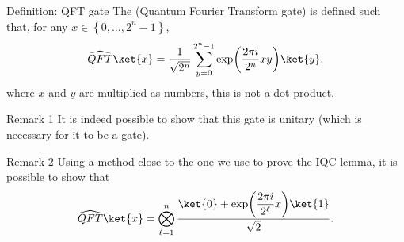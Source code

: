 \documentclass[a4paper]{article}
\begin{document}
\begin{parag}{Definition: QFT gate}
    The  (Quantum Fourier Transform gate) is defined such that, for any $x \in \left\{0, \ldots, 2^n - 1\right\}$, 
    \[\widehat{QFT} \ket{x} = \frac{1}{\sqrt{2^n}} \sum_{y = 0}^{2^n - 1} \exp\left(\frac{2\pi i}{2^n} xy\right) \ket{y}.\]
    where $x$ and $y$ are multiplied as numbers, this is not a dot product. 

    \begin{subparag}{Remark 1}
        It is indeed possible to show that this gate is unitary (which is necessary for it to be a gate).
    \end{subparag}

    \begin{subparag}{Remark 2}
        Using a method close to the one we use to prove the IQC lemma, it is possible to show that 
        \[\widehat{QFT} \ket{x} = \bigotimes_{\ell = 1}^{n} \frac{\ket{0} + \exp\left(\dfrac{2\pi i}{2^\ell } x\right)\ket{1}}{\sqrt{2}}.\]
    \end{subparag}
\end{parag}
\end{document}
